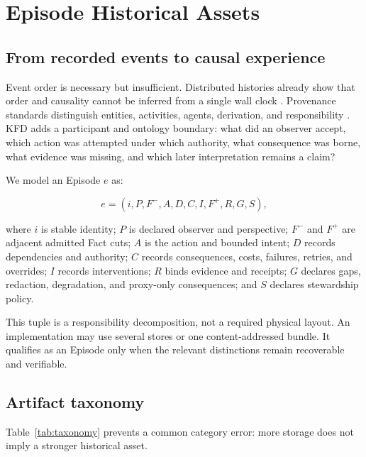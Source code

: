 \section{Episode Historical Assets}
\label{sec:episode-assets}

\subsection{From recorded events to causal experience}

Event order is necessary but insufficient. Distributed histories already show
that order and causality cannot be inferred from a single wall clock
\cite{lamport1978time}. Provenance standards distinguish entities, activities,
agents, derivation, and responsibility \cite{w3cProv2013}. KFD adds a
participant and ontology boundary: what did an observer accept, which action
was attempted under which authority, what consequence was borne, what evidence
was missing, and which later interpretation remains a claim?

We model an Episode $e$ as:

\begin{equation}
e = (i, P, F^{-}, A, D, C, I, F^{+}, R, G, S),
\end{equation}

where $i$ is stable identity; $P$ is declared observer and perspective;
$F^{-}$ and $F^{+}$ are adjacent admitted Fact cuts; $A$ is the action and
bounded intent; $D$ records dependencies and authority; $C$ records
consequences, costs, failures, retries, and overrides; $I$ records
interventions; $R$ binds evidence and receipts; $G$ declares gaps, redaction,
degradation, and proxy-only consequences; and $S$ declares stewardship policy.

This tuple is a responsibility decomposition, not a required physical layout.
An implementation may use several stores or one content-addressed bundle. It
qualifies as an Episode only when the relevant distinctions remain recoverable
and verifiable.

\subsection{Artifact taxonomy}

Table~\ref{tab:taxonomy} prevents a common category error: more storage does
not imply a stronger historical asset.


